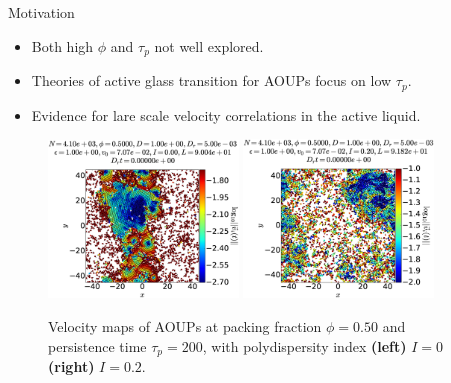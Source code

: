 \documentclass{beamer}
\begin{document}
\begin{frame}{Motivation}

\begin{itemize}
  \item Both high $\phi$ and $\tau_p$ not well explored.
  \item Theories of active glass transition for AOUPs focus on low $\tau_p$.
  \item Evidence for lare scale velocity correlations in the active liquid.
\end{itemize}

\begin{figure}
\centering
\includegraphics[width=0.45\textwidth]{No4096_Fl1000_Vl0000_Tl1000_Ri5000_Dk5000_EL3000.velo.eps}
\includegraphics[width=0.45\textwidth]{No4096_Fl1000_Vl0000_Tl1000_Ri5000_Dk5000_El2000.velo.eps}
\caption{Velocity maps of AOUPs at packing fraction $\phi = 0.50$ and persistence time $\tau_p = 200$, with polydispersity index {\bf (left)} $I = 0$ {\bf (right)} $I = 0.2$.}
\end{figure}


\end{frame}
\end{document}
